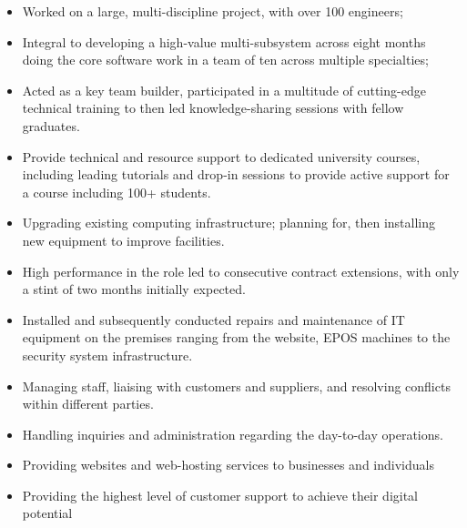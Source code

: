 \documentclass[8pt,a4paper]{altacv}
\begin{document}
\begin{itemize}
\item Worked on a large, multi-discipline project, with over 100 engineers;
\item Integral to developing a high-value multi-subsystem across eight months  doing the core software work in a team of ten across multiple specialties;
\item Acted as a key team builder, participated in a multitude of cutting-edge technical training to then led knowledge-sharing sessions with fellow graduates. 

\divider
\end{itemize}

\begin{itemize}
\item Provide technical and resource support to dedicated university courses, including leading tutorials and drop-in sessions to provide active support for a course including 100+ students.
\item Upgrading existing computing infrastructure; planning for, then installing new equipment to improve facilities.
\item High performance in the role led to consecutive contract extensions, with only a stint of two months initially expected. 

\divider
\end{itemize}

\begin{itemize}
\item Installed and subsequently conducted repairs and maintenance of IT equipment on the premises ranging from the website, EPOS machines to the security system infrastructure.
\item Managing staff, liaising with customers and suppliers, and resolving conflicts within different parties. 
\item Handling inquiries and administration regarding the day-to-day operations.
\divider
\end{itemize}

\begin{itemize}
\item Providing websites and web-hosting services to businesses and individuals
\item Providing the highest level of customer support to achieve their digital potential 
\end{itemize}
\divider
\end{document}
